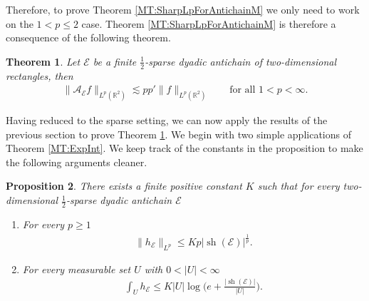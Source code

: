 \documentclass[oneside]{amsart}
\newtheorem{theorem}{Theorem}
\newtheorem{proposition}[theorem]{Proposition}
\theoremstyle{definition}
\theoremstyle{plain}
\numberwithin{equation}{section}
\numberwithin{theorem}{section}
\newcommand{\sh}{\operatorname{sh}}
\begin{document}
Therefore, to prove Theorem \ref{MT:SharpLpForAntichainM}  we only need to work
on the $1 < p \leq 2$ case.
Theorem \ref{MT:SharpLpForAntichainM} is therefore a consequence of the
following theorem.
\begin{theorem} \label{sharp_Lp_for_A}
  Let $\mathcal{E}$ be a finite $\frac{1}{2}$-sparse dyadic antichain of
  two-dimensional rectangles, then
  \begin{align} \label{sharp_Lp_for_A:ineq}
    \|\mathcal{A}_{\mathcal{E}}f\|_{L^p(\mathbb{R}^2)} \lesssim pp'
    \|f\|_{L^p(\mathbb{R}^2)} \qquad \text{for all }1 < p < \infty.
  \end{align}
\end{theorem}

Having reduced to the sparse setting, we can now apply the results of the
previous section to prove Theorem \ref{sharp_Lp_for_A}.
We begin with two simple applications of Theorem \ref{MT:ExpInt}.
We keep track of the constants in the proposition to make the following
arguments cleaner.
\begin{proposition} \label{height_function_bounds}
  There exists a finite positive constant $K$ such that for every
  two-dimensional $\frac{1}{2}$-sparse dyadic antichain $\mathcal{E}$
  \begin{enumerate}
    \item[(a)] For every $p \geq 1$
      \begin{align*}
        \|h_{\mathcal{E}}\|_{L^p} \leq K p |\sh(\mathcal{E})|^{\frac{1}{p}}.
      \end{align*}
    \item[(b)] For every measurable set $U$ with $0 < |U| < \infty$
      \begin{align*}
        \int_{U} h_{\mathcal{E}} \leq K |U|\log\bigg(e +
        \frac{|\sh(\mathcal{E})|}{|U|}\bigg).
      \end{align*}
  \end{enumerate}
\end{proposition}
\end{document}
